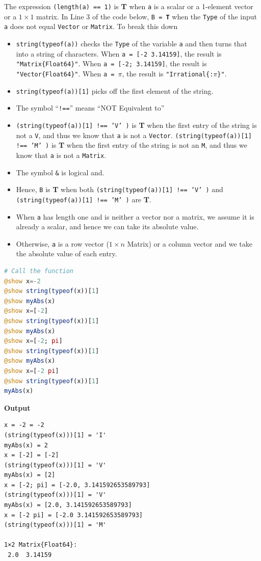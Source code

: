 The expression \texttt{(length(a) == 1)} is \textbf{T} when \texttt{a} is a scalar or a 1-element vector or a $1 \times 1$ matrix. In Line 3 of the code below, \texttt{B = \bf T} when the \texttt{Type} of the input \texttt{a} does not equal \texttt{Vector} or \texttt{Matrix}. To break this down
\begin{itemize}
    \item \texttt{string(typeof(a))} checks the \texttt{Type} of the variable \texttt{a} and then turns that into a string of characters. When \texttt{a = [-2 3.14159]}, the result is \texttt{"Matrix\{Float64\}"}. When \texttt{a = [-2; 3.14159]}, the result is \texttt{"Vector\{Float64\}"}. When \texttt{a = $\pi$}, the result is \texttt{"Irrational\{:$\pi$\}"}.
    \item \texttt{string(typeof(a))[1]} picks off the first element of the string. 
        \item The symbol ``\texttt{!==}'' means ``NOT Equivalent to''
    \item \texttt{(string(typeof(a))[1] !== ’V’ )} is \textbf{T} when the first entry of the string is not a \texttt{V}, and thus we know that \texttt{a} is not a \texttt{Vector}. 
    \texttt{(string(typeof(a))[1] !== ’M’ )} is \textbf{T} when the first entry of the string is not an \texttt{M}, and thus we know that \texttt{a} is not a \texttt{Matrix}. 

    \item The symbol \texttt{\&} is logical and. 
    \item Hence, \texttt{B} is \textbf{T} when both \texttt{(string(typeof(a))[1] !== ’V’ )} and \texttt{(string(typeof(a))[1] !== ’M’ )} are \textbf{T}.
    \item When \texttt{a} has length one and is neither a vector nor a matrix, we assume it is already a scalar, and hence we can take its absolute value.
    \item Otherwise, \texttt{a} is a row vector ($1 \times n$ Matrix) or a column vector and we take the absolute value of each entry.
\end{itemize}


\begin{lstlisting}[language=Julia,style=mystyle]
# Call the function
@show x=-2
@show string(typeof(x))[1]
@show myAbs(x)
@show x=[-2]
@show string(typeof(x))[1]
@show myAbs(x)
@show x=[-2; pi]
@show string(typeof(x))[1]
@show myAbs(x)
@show x=[-2 pi]
@show string(typeof(x))[1]
myAbs(x)
\end{lstlisting}
\textbf{Output} 
\begin{verbatim}
x = -2 = -2
(string(typeof(x)))[1] = 'I'
myAbs(x) = 2
x = [-2] = [-2]
(string(typeof(x)))[1] = 'V'
myAbs(x) = [2]
x = [-2; pi] = [-2.0, 3.141592653589793]
(string(typeof(x)))[1] = 'V'
myAbs(x) = [2.0, 3.141592653589793]
x = [-2 pi] = [-2.0 3.141592653589793]
(string(typeof(x)))[1] = 'M'

1×2 Matrix{Float64}:
 2.0  3.14159
\end{verbatim}




